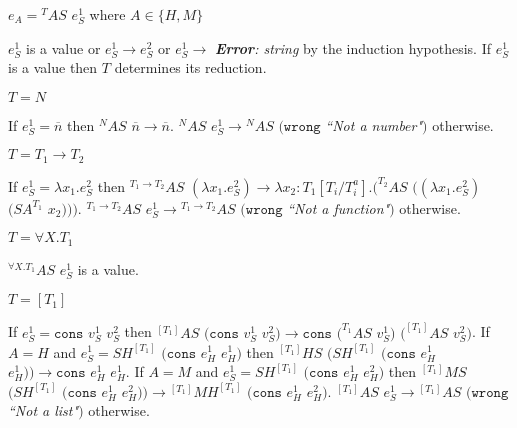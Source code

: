 \begin{case}

$e_{A}={^{T}A}S$ $e_{S}^{1}$ where $A\in\lbrace H,M\rbrace$

$e_{S}^{1}$ is a value or $e_{S}^{1}\rightarrow e_{S}^{2}$ or $e_{S}^{1}\rightarrow$ \emph{\textbf{Error}: string} by the induction hypothesis.  If $e_{S}^{1}$ is a value then $T$ determines its reduction.

\begin{subcase}

$T=N$

If $e_{S}^{1}=\overline{n}$ then $^{N}AS$ $\overline{n}\rightarrow\overline{n}$.  $^{N}AS$ $e_{S}^{1}\rightarrow{^{N}A}S$ $(\mathtt{wrong}$ \emph{``Not a number"}$)$ otherwise.

\end{subcase}

\begin{subcase}

$T=T_{1}\rightarrow T_{2}$

If $e_{S}^{1}=\lambda x_{1}.e_{S}^{2}$ then $^{T_{1}\rightarrow T_{2}}AS$ $(\lambda x_{1}.e_{S}^{2})\rightarrow\lambda x_{2}:T_{1}[T_{i}/T^{a}_{i}].(^{T_{2}}AS$ $((\lambda x_{1}.e_{S}^{2})$ $(SA^{T_{1}}$ $x_{2})))$.  $^{T_{1}\rightarrow T_{2}}AS$ $e_{S}^{1}\rightarrow{^{T_{1}\rightarrow T_{2}}A}S$ $(\mathtt{wrong}$ \emph{``Not a function"}$)$ otherwise.

\end{subcase}

\begin{subcase}

$T=\forall X.T_{1}$

$^{\forall X.T_{1}}AS$ $e_{S}^{1}$ is a value.

\end{subcase}

\begin{subcase}

$T=[T_{1}]$

If $e_{S}^{1}=\mathtt{cons}$ $v_{S}^{1}$ $v_{S}^{2}$ then $^{[T_{1}]}AS$ $(\mathtt{cons}$ $v_{S}^{1}$ $v_{S}^{2})\rightarrow\mathtt{cons}$ $(^{T_{1}}AS$ $v_{S}^{1})$ $(^{[T_{1}]}AS$ $v_{S}^{2})$.  If $A=H$ and $e_{S}^{1}=SH^{[T_{1}]}$ $(\mathtt{cons}$ $e_{H}^{1}$ $e_{H}^{1})$ then $^{[T_{1}]}HS$ $(SH^{[T_{1}]}$ $(\mathtt{cons}$ $e_{H}^{1}$ $e_{H}^{1}))\rightarrow\mathtt{cons}$ $e_{H}^{1}$ $e_{H}^{1}$.  If $A=M$ and $e_{S}^{1}=SH^{[T_{1}]}$ $(\mathtt{cons}$ $e_{H}^{1}$ $e_{H}^{2})$ then $^{[T_{1}]}MS$ $(SH^{[T_{1}]}$ $(\mathtt{cons}$ $e_{H}^{1}$ $e_{H}^{2}))\rightarrow{^{[T_{1}]}M}H^{[T_{1}]}$ $(\mathtt{cons}$ $e_{H}^{1}$ $e_{H}^{2})$.  $^{[T_{1}]}AS$ $e_{S}^{1}\rightarrow{^{[T_{1}]}A}S$ $(\mathtt{wrong}$ \emph{``Not a list"}$)$ otherwise.


\end{subcase}
\end{case}
